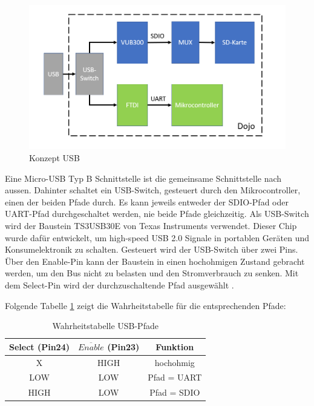 \begin{figure}[h]
	\centering
	\includegraphics[width=\textwidth]{Bilder/Konzept_USB.PNG}
	\caption{Konzept USB}
	\label{Konzept_USB}
\end{figure}

Eine Micro-USB Typ B Schnittstelle ist die gemeinsame Schnittstelle nach aussen. Dahinter schaltet ein USB-Switch, gesteuert durch den Mikrocontroller, einen der beiden Pfade durch. Es kann jeweils entweder der SDIO-Pfad oder UART-Pfad durchgeschaltet werden, nie beide Pfade gleichzeitig.\newline
Als USB-Switch wird der Baustein TS3USB30E von Texas Instruments verwendet. Dieser Chip wurde dafür entwickelt, um high-speed USB 2.0 Signale in portablen Geräten und Konsumelektronik zu schalten. Gesteuert wird der USB-Switch über zwei Pins. Über den Enable-Pin kann der Baustein in einen hochohmigen Zustand gebracht werden, um den Bus nicht zu belasten und den Stromverbrauch zu senken. Mit dem Select-Pin wird der durchzuschaltende Pfad ausgewählt \cite{DatasheetTS3USB}.

Folgende Tabelle \ref{truth_table_usb} zeigt die Wahrheitstabelle für die entsprechenden Pfade:
\begin{table}[h]
	\centering
	\begin{tabular}{|c|c|c|} 
		Select (Pin24) & $\overline{Enable}$ (Pin23) & Funktion \\ 
		\hline 
		X & HIGH & hochohmig \\ 
		\hline 
		LOW & LOW & Pfad = UART \\ 
		\hline 
		HIGH & LOW & Pfad = SDIO \\ 
	\end{tabular} 
	\caption{Wahrheitstabelle USB-Pfade}
	\label{truth_table_usb}
\end{table}


